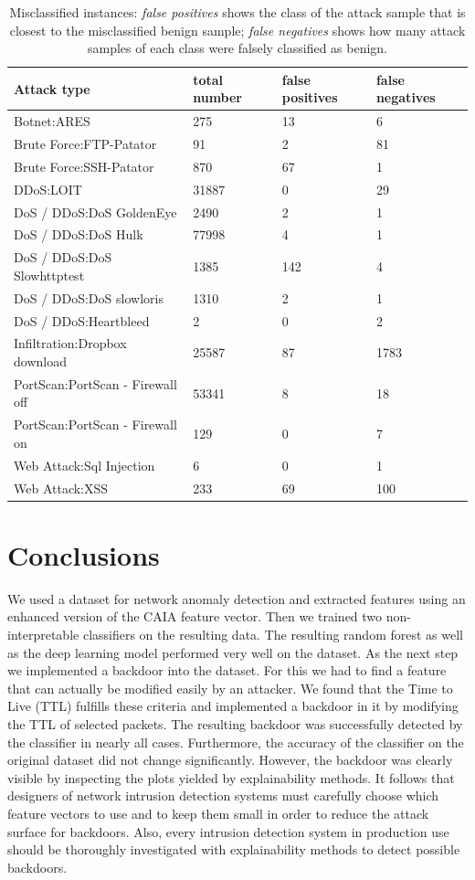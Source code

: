 \documentclass[sigconf,nonacm]{acmart}
\begin{document}
\begin{table}
\caption{Misclassified instances: \textit{false positives} shows the class of the attack sample that is closest to the misclassified benign sample; \textit{false negatives} shows how many attack samples of each class were falsely classified as benign.}
\label{tab:misclassified_instances}
\begin{tabular}{l l l l} 
\toprule 
Attack type & total number & false positives & false negatives \\
\midrule
Botnet:ARES  & 275 & 13 & 6 \\
Brute Force:FTP-Patator & 91 & 2 & 81 \\
Brute Force:SSH-Patator & 870 & 67 & 1 \\
DDoS:LOIT & 31887 & 0 & 29 \\
DoS / DDoS:DoS GoldenEye & 2490 & 2 & 1 \\
DoS / DDoS:DoS Hulk & 77998 & 4 & 1 \\
DoS / DDoS:DoS Slowhttptest & 1385 & 142 & 4 \\
DoS / DDoS:DoS slowloris & 1310 & 2 & 1 \\
DoS / DDoS:Heartbleed & 2 & 0 & 2 \\
Infiltration:Dropbox download & 25587 & 87 & 1783 \\
PortScan:PortScan - Firewall off & 53341 & 8 & 18 \\
PortScan:PortScan - Firewall on & 129 & 0 & 7 \\
Web Attack:Sql Injection & 6 & 0 & 1 \\
Web Attack:XSS & 233 & 69 & 100 \\
\bottomrule
\end{tabular}
\end{table}


\section{Conclusions}

We used a dataset for network anomaly detection and extracted features using an enhanced version of the CAIA feature vector. Then we trained two non-interpretable classifiers on the resulting data. The resulting random forest as well as the deep learning model performed very well on the dataset. As the next step we implemented a backdoor into the dataset. For this we had to find a feature that can actually be modified easily by an attacker. We found that the Time to Live (TTL) fulfills these criteria and implemented a backdoor in it by modifying the TTL of selected packets. The resulting backdoor was successfully detected by the classifier in nearly all cases. Furthermore, the accuracy of the classifier on the original dataset did not change significantly. However, the backdoor was clearly visible by inspecting the plots yielded by explainability methods. It follows that designers of network intrusion detection systems must carefully choose which feature vectors to use and to keep them small in order to reduce the attack surface for backdoors. Also, every intrusion detection system in production use should be thoroughly investigated with explainability methods to detect possible backdoors. 



\end{document}
